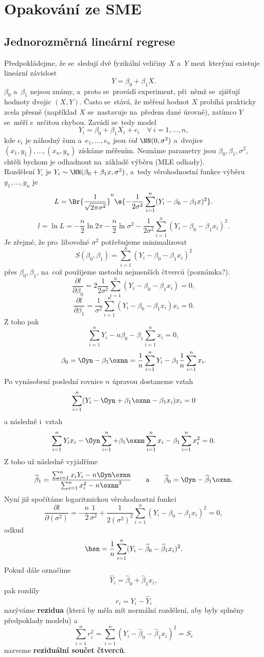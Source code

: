 \chapter{Opakování ze SME}
\section{Jednorozměrná lineární regrese}
Předpokládejme, že se~sledují dvě fyzikální veličiny $X$ a~$Y$ mezi~kterými existuje lineární závislost
$$Y=\beta_0+\beta_1X .$$
$\beta_0$ a~$\beta_1$ nejsou známy, a~proto se~provádí experiment, při~němž se~zjišťují hodnoty dvojic $(X,Y)$. Často se~stává, že měření hodnot $X$ probíhá prakticky zcela přesně (například $X$ se~nastavuje na~předem dané úrovně), zatímco $Y$ se~měří s~určitou chybou. Zavádí se~tedy model
$$Y_i=\beta_0 +\beta_1X_i + e_i \quad \forall~i=1,...,n,$$
kde $e_i$ je náhodný šum a~$e_1,...,e_n$ jsou $iid~\NN(0,{\sigma}^2)$ a~dvojice $(x_1,y_1),...,(x_n,y_n)$ získáme měřením. Neznáme parametry jsou $\beta_0,\beta_1, {\sigma}^2$, chtěli bychom je odhadnout na~základě výběru (MLE odhady).\\

Rozdělení $Y_i$ je $Y_i\sim\NN(\beta_0 + \beta_1x,{\sigma}^2)$, a~tedy věrohodnostní funkce výběru $y_1,...,y_n$ je
$$L=\Br{\frac{1}{\sqrt{2\pi{\sigma}^2}}}^n \e{-\frac{1}{2{\sigma}^2}\sum_{i=1}^{n}(Y_i-\beta_0-\beta_1x)^2}.$$
$$l=\ln L=-\frac{n}{2}\ln{2\pi}-\frac{n}{2}\ln{{\sigma}^2}-\frac{1}{2{\sigma}^2}\sum_{i=1}^{n}(Y_i-\beta_0-\beta_1x_i)^2.$$
Je zřejmé, že pro~libovolné ${\sigma}^2$ potřebujeme minimalizovat
$$S(\beta_0,\beta_1)=\sum_{i=1}^{n}(Y_i-\beta_0-\beta_1x_i)^2   $$
přes $\beta_0,\beta_1$, na~což použijeme metodu nejmenších čtverců (poznámka?).
$$\frac{\partial l}{\partial \beta_0}=2\frac{1}{2{\sigma}^2}\sum_{i=1}^{n}(Y_i-\beta_0-\beta_1x_i)=0,  $$
$$\frac{\partial l}{\partial \beta_1}=\frac{1}{{\sigma}^2}\sum_{i=1}^{n}(Y_i-\beta_0-\beta_1x_i) x_i=0. $$
Z toho pak
$$  \sum_{i=1}^{n} Y_i -n\beta_0-\beta_1 \sum_{i=1}^{n} x_i=0, $$
$$ \beta_0=\Oyn -\beta_1\oxnn=\frac{1}{n}\sum_{i=1}^{n}Y_i-\beta_1\frac{1}{n}\sum_{i=1}^{n}x_i.$$
Po vynásobení poslední rovnice $n$ úpravou dostaneme vztah
$$\sum_{i=1}^{n}(Y_i-\Oyn+\beta_1\oxnn-\beta_1x_i)x_i=0  $$
a následně i~vztah
$$ \sum_{i=1}^{n}Y_ix_i-\Oyn\sum_{i=1}^{n}+\beta_1\oxnn\sum_{i=1}^{n}x_i-\beta_1\sum_{i=1}^{n}x_i^2=0. $$
Z toho už následně vyjádříme
$$ \widehat{\beta}_1=\frac{\sum_{i=1}^{n}x_iY_i-n\Oyn\oxnn}{\sum_{i=1}^{n}x_i^2-n\oxnn^2}\qquad\text{a}\qquad \widehat{\beta}_0=\Oyn-\widehat{\beta}_1\oxnn. $$
Nyní již spočítáme logaritmickou věrohodnostní funkci
$$\frac{\partial l}{\partial ({\sigma}^2)}=-\frac{n}{2}\frac{1}{{\sigma}^2}+\frac{1}{2({\sigma}^2)^2}\sum_{i=1}^{n}(Y_i-\beta_0-\beta_1x_i)^2=0,$$
odkud
$$\hsn=\frac{1}{n}\sum_{i=1}^{n}(Y_i-\widehat{\beta}_0-\widehat{\beta}_1x_i)^2. $$
Pokud dále označíme
$$\widehat{Y}_i=\widehat{\beta}_0+\widehat{\beta}_1x_i, $$
pak rozdíly
$$r_i=Y_i-\widehat{Y}_i $$
nazýváme \textbf{rezidua} (která by měla mít normální rozdělení, aby byly splněny předpoklady modelu) a~
$$ \sum_{i=1}^{n}r_i^2=\sum_{i=1}^{n}(Y_i-\widehat{\beta}_0-\widehat{\beta}_1x_i)^2=S_e  $$
nazveme \textbf{reziduální součet čtverců}.
